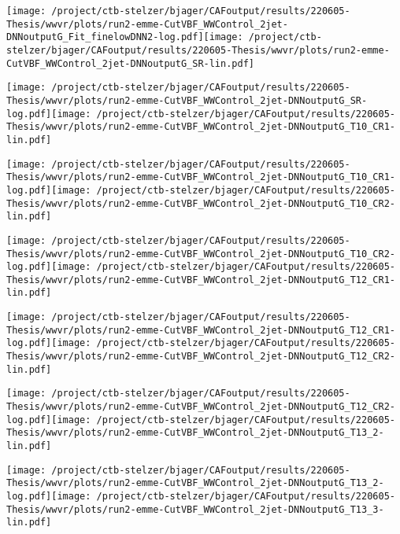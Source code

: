 \documentclass{article}
\begin{document}
\texttt{[image: /project/ctb-stelzer/bjager/CAFoutput/results/220605-Thesis/wwvr/plots/run2-emme-CutVBF\_WWControl\_2jet-DNNoutputG\_Fit\_finelowDNN2-log.pdf]}\texttt{[image: /project/ctb-stelzer/bjager/CAFoutput/results/220605-Thesis/wwvr/plots/run2-emme-CutVBF\_WWControl\_2jet-DNNoutputG\_SR-lin.pdf]}

\texttt{[image: /project/ctb-stelzer/bjager/CAFoutput/results/220605-Thesis/wwvr/plots/run2-emme-CutVBF\_WWControl\_2jet-DNNoutputG\_SR-log.pdf]}\texttt{[image: /project/ctb-stelzer/bjager/CAFoutput/results/220605-Thesis/wwvr/plots/run2-emme-CutVBF\_WWControl\_2jet-DNNoutputG\_T10\_CR1-lin.pdf]}

\texttt{[image: /project/ctb-stelzer/bjager/CAFoutput/results/220605-Thesis/wwvr/plots/run2-emme-CutVBF\_WWControl\_2jet-DNNoutputG\_T10\_CR1-log.pdf]}\texttt{[image: /project/ctb-stelzer/bjager/CAFoutput/results/220605-Thesis/wwvr/plots/run2-emme-CutVBF\_WWControl\_2jet-DNNoutputG\_T10\_CR2-lin.pdf]}

\texttt{[image: /project/ctb-stelzer/bjager/CAFoutput/results/220605-Thesis/wwvr/plots/run2-emme-CutVBF\_WWControl\_2jet-DNNoutputG\_T10\_CR2-log.pdf]}\texttt{[image: /project/ctb-stelzer/bjager/CAFoutput/results/220605-Thesis/wwvr/plots/run2-emme-CutVBF\_WWControl\_2jet-DNNoutputG\_T12\_CR1-lin.pdf]}

\texttt{[image: /project/ctb-stelzer/bjager/CAFoutput/results/220605-Thesis/wwvr/plots/run2-emme-CutVBF\_WWControl\_2jet-DNNoutputG\_T12\_CR1-log.pdf]}\texttt{[image: /project/ctb-stelzer/bjager/CAFoutput/results/220605-Thesis/wwvr/plots/run2-emme-CutVBF\_WWControl\_2jet-DNNoutputG\_T12\_CR2-lin.pdf]}

\texttt{[image: /project/ctb-stelzer/bjager/CAFoutput/results/220605-Thesis/wwvr/plots/run2-emme-CutVBF\_WWControl\_2jet-DNNoutputG\_T12\_CR2-log.pdf]}\texttt{[image: /project/ctb-stelzer/bjager/CAFoutput/results/220605-Thesis/wwvr/plots/run2-emme-CutVBF\_WWControl\_2jet-DNNoutputG\_T13\_2-lin.pdf]}

\texttt{[image: /project/ctb-stelzer/bjager/CAFoutput/results/220605-Thesis/wwvr/plots/run2-emme-CutVBF\_WWControl\_2jet-DNNoutputG\_T13\_2-log.pdf]}\texttt{[image: /project/ctb-stelzer/bjager/CAFoutput/results/220605-Thesis/wwvr/plots/run2-emme-CutVBF\_WWControl\_2jet-DNNoutputG\_T13\_3-lin.pdf]}
\end{document}
